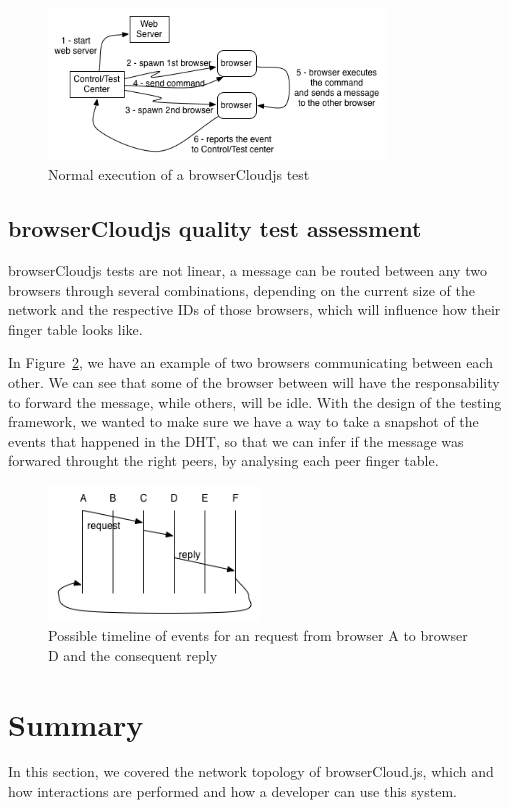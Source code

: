 \begin{figure}[h!]
  \centering
  \includegraphics[width=0.8\textwidth]{figs/testing-framework-1}
  \caption{Normal execution of a browserCloudjs test}
  \label{fig:t-f-1}
\end{figure}

\subsection{browserCloudjs quality test assessment} 

browserCloudjs tests are not linear, a message can be routed between any two browsers through several combinations, depending on the current size of the network and the respective IDs of those browsers, which will influence how their finger table looks like.

In Figure~\ref{fig:t-f-2}, we have an example of two browsers communicating between each other. We can see that some of the browser between will have the responsability to forward the message, while others, will be idle. With the design of the testing framework, we wanted to make sure we have a way to take a snapshot of the events that happened in the DHT, so that we can infer if the message was forwared throught the right peers, by analysing each peer finger table.

\begin{figure}[h!]
  \centering
  \includegraphics[width=0.5\textwidth]{figs/testing-framework-2}
  \caption{Possible timeline of events for an request from browser A to browser D and the consequent reply}
  \label{fig:t-f-2}
\end{figure}

\section{Summary}

In this section, we covered the network topology of browserCloud.js, which and how interactions are performed and how a developer can use this system.
